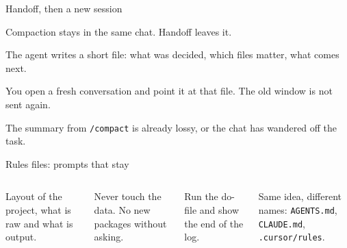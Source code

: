 \begin{frame}{Handoff, then a new session}
  \vspace{0.5em}
  {\small Compaction stays in the same chat. Handoff leaves it.\par}
  \vspace{0.9em}
  {\small
  {The agent writes a short file: what was decided, which files matter, what comes next.\par}
  \vspace{0.7em}
  {You open a fresh conversation and point it at that file. The old window is not sent again.\par}
  \vspace{0.7em}
  {The summary from \texttt{/compact} is already lossy, or the chat has wandered off the task.\par}}
\end{frame}

\begin{frame}{Rules files: prompts that stay}
  \begin{columns}[T,onlytextwidth]
      \vspace{0.2em}
      {\small
      {\color{muted}Layout of the project, what is raw and what is output.\par}
      \vspace{0.6em}
      {\color{muted}Never touch the data. No new packages without asking.\par}
      \vspace{0.6em}
      {\color{muted}Run the do-file and show the end of the log.\par}
      \vspace{0.9em}
      {\color{muted}Same idea, different names: \texttt{AGENTS.md}, \texttt{CLAUDE.md}, \texttt{.cursor/rules}.\par}}
  \end{columns}
\end{frame}

